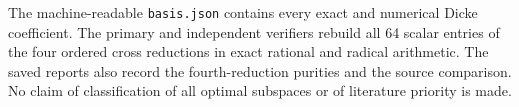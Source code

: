 \documentclass[11pt]{article}
\begin{document}
The machine-readable \texttt{basis.json} contains every exact and
numerical Dicke coefficient. The primary and independent verifiers
rebuild all 64 scalar entries of the four ordered cross reductions in
exact rational and radical arithmetic. The saved reports also record
the fourth-reduction purities and the source comparison. No claim of
classification of all optimal subspaces or of literature priority is made.
\end{document}
